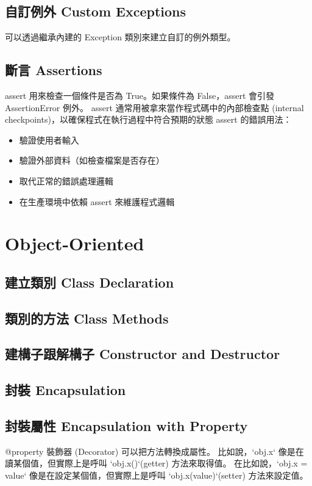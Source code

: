 \documentclass[a4paper,10pt,twocolumn,oneside]{article}
\begin{document}
\subsection{自訂例外 Custom Exceptions}
可以透過繼承內建的 Exception 類別來建立自訂的例外類型。

\subsection{斷言 Assertions}
assert 用來檢查一個條件是否為 True。如果條件為 False，assert 會引發 AssertionError 例外。
assert 通常用被拿來當作程式碼中的內部檢查點 (internal checkpoints)，以確保程式在執行過程中符合預期的狀態
assert 的錯誤用法：
\begin{itemize}
    \item 驗證使用者輸入
    \item 驗證外部資料（如檢查檔案是否存在）
    \item 取代正常的錯誤處理邏輯
    \item 在生產環境中依賴 assert 來維護程式邏輯
\end{itemize}


\section{Object-Oriented}
\subsection{建立類別 Class Declaration}

\subsection{類別的方法 Class Methods}

\subsection{建構子跟解構子 Constructor and Destructor}

\subsection{封裝 Encapsulation}

\subsection{封裝屬性 Encapsulation with Property}
@property 裝飾器 (Decorator) 可以把方法轉換成屬性。
比如說，`obj.x` 像是在讀某個值，但實際上是呼叫 `obj.x()`(getter) 方法來取得值。
在比如說，`obj.x = value` 像是在設定某個值，但實際上是呼叫 `obj.x(value)`(setter) 方法來設定值。

\end{document}
